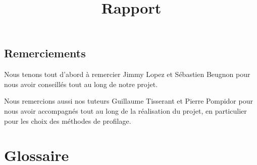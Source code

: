 \documentclass{report}
\title{Rapport}
\author{}
\date{}
\begin{document}



\newpage
\null %
\newpage


\section*{Remerciements}
\hspace{0.5cm}Nous tenons tout d'abord à remercier Jimmy Lopez et Sébastien Beugnon pour nous avoir conseillés tout au long de notre projet.
	
	
	Nous remercions aussi nos tuteurs Guillaume Tisserant et Pierre Pompidor pour nous avoir accompagnés tout au long de la réalisation du projet, en particulier pour les choix des méthodes de profilage.

\newpage

            


\tableofcontents %

\newpage

\listoffigures %

\newpage
\chapter*{Glossaire}
\end{document}
